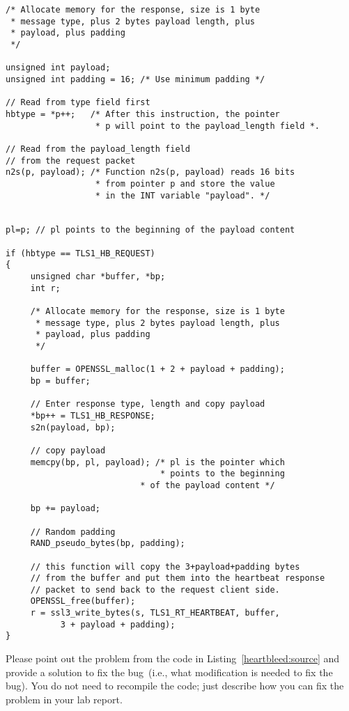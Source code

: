 \begin{lstlisting}[caption={Process the Heartbeat request packet and generate the response packet}, 
      label=heartbleed:source]
/* Allocate memory for the response, size is 1 byte
 * message type, plus 2 bytes payload length, plus
 * payload, plus padding
 */

unsigned int payload;
unsigned int padding = 16; /* Use minimum padding */

// Read from type field first  
hbtype = *p++;   /* After this instruction, the pointer
                  * p will point to the payload_length field *.

// Read from the payload_length field 
// from the request packet 
n2s(p, payload); /* Function n2s(p, payload) reads 16 bits
                  * from pointer p and store the value 
                  * in the INT variable "payload". */
			  
			  
pl=p; // pl points to the beginning of the payload content
			  
if (hbtype == TLS1_HB_REQUEST)
{
     unsigned char *buffer, *bp;
     int r;

     /* Allocate memory for the response, size is 1 byte
      * message type, plus 2 bytes payload length, plus
      * payload, plus padding
      */

     buffer = OPENSSL_malloc(1 + 2 + payload + padding);
     bp = buffer;

     // Enter response type, length and copy payload 
     *bp++ = TLS1_HB_RESPONSE;
     s2n(payload, bp);
        
     // copy payload 
     memcpy(bp, pl, payload); /* pl is the pointer which 
                               * points to the beginning 
	                       * of the payload content */

     bp += payload;
			    
     // Random padding
     RAND_pseudo_bytes(bp, padding);			    

     // this function will copy the 3+payload+padding bytes
     // from the buffer and put them into the heartbeat response 
     // packet to send back to the request client side.
     OPENSSL_free(buffer);
     r = ssl3_write_bytes(s, TLS1_RT_HEARTBEAT, buffer,
           3 + payload + padding); 
}
\end{lstlisting}


Please point out the problem from the code in
Listing~\ref{heartbleed:source} and provide a solution to fix the
bug~(i.e., what modification is needed to fix the bug). You do not need to
recompile the code; just describe how you can fix the problem in your lab
report. 


